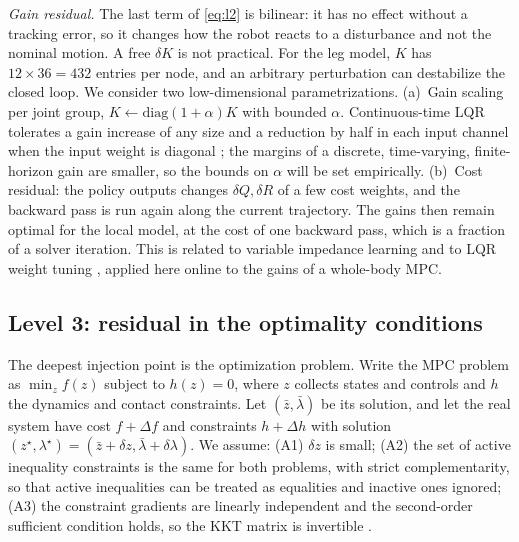 \documentclass[conference]{IEEEtran}
\newcommand{\zb}{\bar{z}}
\newcommand{\lb}{\bar{\lambda}}
\begin{document}
\emph{Gain residual.} The last term of \eqref{eq:l2} is bilinear: it has no effect without a tracking error, so it changes how the robot reacts to a disturbance and not the nominal motion.
A free $\delta K$ is not practical.
For the leg model, $K$ has $12\times36=432$ entries per node, and an arbitrary perturbation can destabilize the closed loop.
We consider two low-dimensional parametrizations.
(a)~Gain scaling per joint group, $K\leftarrow\mathrm{diag}(1+\alpha)K$ with bounded $\alpha$.
Continuous-time LQR tolerates a gain increase of any size and a reduction by half in each input channel when the input weight is diagonal \cite{safonov1977margins}; the margins of a discrete, time-varying, finite-horizon gain are smaller, so the bounds on $\alpha$ will be set empirically.
(b)~Cost residual: the policy outputs changes $\delta Q,\delta R$ of a few cost weights, and the backward pass is run again along the current trajectory.
The gains then remain optimal for the local model, at the cost of one backward pass, which is a fraction of a solver iteration.
This is related to variable impedance learning \cite{buchli2011variable} and to LQR weight tuning \cite{marco2016lqr}, applied here online to the gains of a whole-body MPC.

\subsection{Level 3: residual in the optimality conditions}
\label{sec:l3}
The deepest injection point is the optimization problem.
Write the MPC problem as $\min_z f(z)$ subject to $h(z)=0$, where $z$ collects states and controls and $h$ the dynamics and contact constraints.
Let $(\zb,\lb)$ be its solution, and let the real system have cost $f+\Delta f$ and constraints $h+\Delta h$ with solution $(z^\star,\lambda^\star)=(\zb+\delta z,\lb+\delta\lambda)$.
We assume: (A1) $\delta z$ is small; (A2) the set of active inequality constraints is the same for both problems, with strict complementarity, so that active inequalities can be treated as equalities and inactive ones ignored; (A3) the constraint gradients are linearly independent and the second-order sufficient condition holds, so the KKT matrix is invertible \cite{nocedal2006numerical}.
\end{document}

